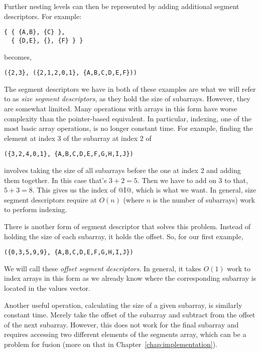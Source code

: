 Further nesting levels can then be represented by adding additional segment descriptors. For example:
%
\begin{lstlisting}
{ { {A,B}, {C} },
  { {D,E}, {}, {F} } }
\end{lstlisting}
%
becomes,
%
\begin{lstlisting}
({2,3}, ({2,1,2,0,1}, {A,B,C,D,E,F}))
\end{lstlisting}



The segment descriptors we have in both of these examples are what we will refer to as \emph{size segment descriptors}, as they hold the size of subarrays. However, they are somewhat limited. Many operations with arrays in this form have worse complexity than the pointer-based equivalent. In particular, indexing, one of the most basic array operations, is no longer constant time. For example, finding the element at index 3 of the subarray at index 2 of
%
\begin{lstlisting}
({3,2,4,0,1}, {A,B,C,D,E,F,G,H,I,J})
\end{lstlisting}
%
involves taking the size of all subarrays before the one at index 2 and adding them together. In this case that's $3+2=5$. Then we have to add on 3 to that, $5+3=8$. This gives us the index of @I@, which is what we want. In general, size segment descriptors require at $O(n)$ (where $n$ is the number of subarrays) work to perform indexing.

There is another form of segment descriptor that solves this problem. Instead of holding the size of each subarray, it holds the offset. So, for our first example,
%
\begin{lstlisting}
({0,3,5,9,9}, {A,B,C,D,E,F,G,H,I,J})
\end{lstlisting}
%
We will call these \emph{offset segment descriptors}. In general, it takes $O(1)$ work to index arrays in this form as we already know where the corresponding subarray is located in the values vector.

Another useful operation, calculating the size of a given subarray, is similarly constant time. Merely take the offset of the subarray and subtract from the offset of the next subarray. However, this does not work for the final subarray and requires accessing two different elements of the segments array, which can be a problem for fusion (more on that in Chapter~\ref{chap:implementation}).

